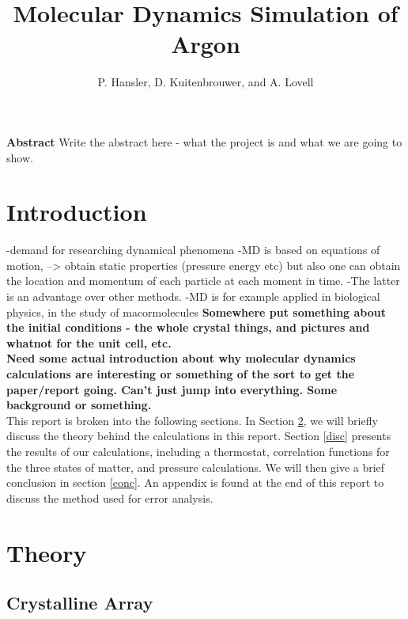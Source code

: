 \documentclass{article}
\begin{document}
\title{Molecular Dynamics Simulation of Argon}
\author{P. Hansler, D. Kuitenbrouwer, and A. Lovell}
\maketitle

\begin{center}
\textbf{Abstract}  Write the abstract here - what the project is and what we are going to show.  \\
\end{center}

\begin{multicols}{2}

\section{Introduction}

-demand for researching dynamical phenomena
-MD is based on equations of motion, --> obtain static properties (pressure energy etc) but also one can obtain the location and momentum of each particle at each moment in time.
-The latter is an advantage over other methods. \cite{thijssen}
-MD is for example applied in biological physics, in the study of macormolecules \cite{deGroot}
\textbf{Somewhere put something about the initial conditions - the whole crystal things, and pictures and whatnot for the unit cell, etc.} \\

\textbf{Need some actual introduction about why molecular dynamics calculations are interesting or something of the sort to get the paper/report going.  Can't just jump into everything.  Some background or something.} \\

This report is broken into the following sections.  In Section \ref{theory}, we will briefly discuss the theory behind the calculations in this report.  Section \ref{disc} presents the results of our calculations, including a thermostat, correlation functions for the three states of matter, and pressure calculations.  We will then give a brief conclusion in section \ref{conc}.  An appendix is found at the end of this report to discuss the method used for error analysis.  

\section{Theory}
\label{theory}

\subsection{Crystalline Array}


\end{multicols}
\end{document}
